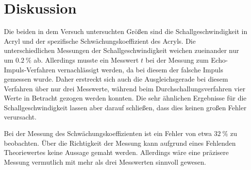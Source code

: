 \section{Diskussion}
\label{sec:Diskussion}


Die beiden in dem Versuch untersuchten Größen sind die Schallgeschwindigkeit in Acryl und der spezifische Schwächungskoeffizient 
des Acryls. Die unterschiedlichen Messungen der Schallgeschwindigkeit weichen zueinander nur um $\SI{0.2}{\percent} $ ab. 
Allerdings musste ein Messwert $t$ bei der Messung zum Echo-Impuls-Verfahren vernachlässigt werden, da bei diesem der falsche 
Impuls gemessen wurde. Daher erstreckt sich auch die Ausgleichsgerade bei diesem Verfahren über nur drei Messwerte, während 
beim Durchschallungsverfahren vier Werte in Betracht gezogen werden konnten. Die sehr ähnlichen Ergebnisse für die Schallgeschwindigkeit
lassen aber darauf schließen, dass dies keinen großen Fehler verursacht. 

Bei der Messung des Schwächungskoeffizienten ist ein Fehler von etwa $\SI{32}{\percent} $ zu beobachten. Über die Richtigkeit der 
Messung kann aufgrund eines Fehlenden Theoriewertes keine Aussage gemaht werden. Allerdings wäre eine präzisere Messung vermutlich 
mit mehr als drei Messwerten sinnvoll gewesen. 
